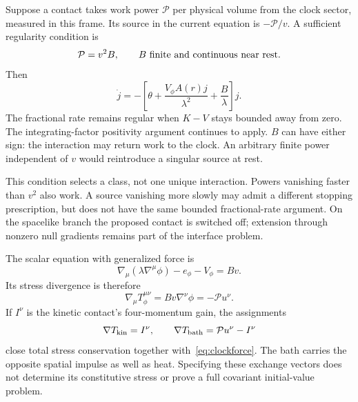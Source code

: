 \documentclass[11pt]{article}
\begin{document}
Suppose a contact takes work power $\mathcal P$ per physical volume from
the clock sector, measured in this frame. Its source in the current equation
is $-\mathcal P/v$. A sufficient regularity condition is
\begin{equation}\label{eq:gate}
 \mathcal P=v^2 B,\qquad B\ \hbox{finite and continuous near rest}.
\end{equation}
Then
\begin{equation}\label{eq:current}
 \dot j=-\left[\theta+\frac{V_\phi A(r)j}{\lambda^2}
                         +\frac{B}{\lambda}\right]j.
\end{equation}
The fractional rate remains regular when $K-V$ stays bounded away from
zero. The integrating-factor positivity argument continues to apply.
$B$ can have either sign: the interaction may return work to the clock.
An arbitrary finite power independent of $v$ would reintroduce a singular
source at rest.

This condition selects a class, not one unique interaction. Powers vanishing
faster than $v^2$ also work. A source vanishing more slowly may admit a
different stopping prescription, but does not have the same bounded
fractional-rate argument. On the spacelike branch the proposed contact is
switched off; extension through nonzero null gradients remains part of the
interface problem.

The scalar equation with generalized force is
\begin{equation}
 \nabla_\mu(\lambda\nabla^\mu\phi)-e_\phi-V_\phi=Bv.
\end{equation}
Its stress divergence is therefore
\begin{equation}\label{eq:clockforce}
 \nabla_\mu T_\phi^{\mu\nu}=Bv\nabla^\nu\phi
                         =-\mathcal P u^\nu.
\end{equation}
If $I^\nu$ is the kinetic contact's four-momentum gain, the assignments
\begin{equation}\label{eq:ledger}
 \nabla T_{\rm kin}=I^\nu,\qquad
 \nabla T_{\rm bath}=\mathcal P u^\nu-I^\nu
\end{equation}
close total stress conservation together with~\eqref{eq:clockforce}.
The bath carries the opposite spatial impulse as well as heat. Specifying
these exchange vectors does not determine its constitutive stress or prove
a full covariant initial-value problem.
\end{document}
